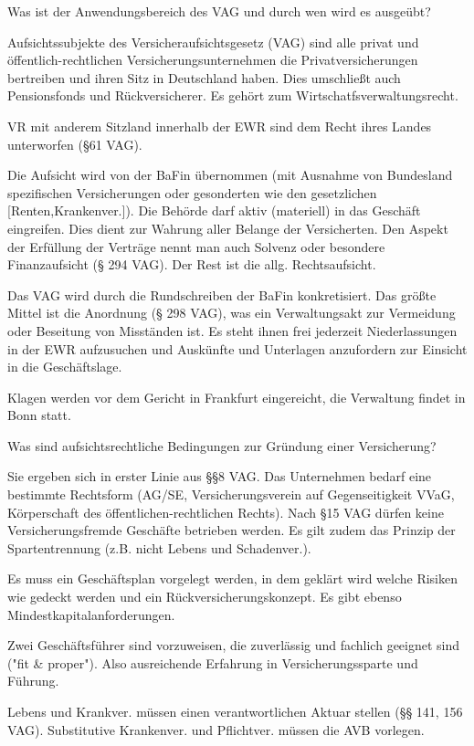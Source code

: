 Was ist der Anwendungsbereich des VAG
und durch wen wird es ausgeübt?

Aufsichtssubjekte des Versicheraufsichtsgesetz (VAG) sind
alle privat und öffentlich-rechtlichen Versicherungsunternehmen
die Privatversicherungen bertreiben und ihren Sitz in Deutschland haben.
Dies umschließt auch Pensionsfonds und Rückversicherer. Es gehört zum Wirtschatfsverwaltungsrecht.

VR mit anderem Sitzland innerhalb der EWR sind dem Recht ihres Landes unterworfen (§61 VAG).

Die Aufsicht wird von der BaFin übernommen (mit Ausnahme von Bundesland spezifischen Versicherungen oder gesonderten
wie den gesetzlichen [Renten,Krankenver.]).
Die Behörde darf aktiv (materiell) in das Geschäft eingreifen. Dies dient zur Wahrung aller Belange der Versicherten.
Den Aspekt der Erfüllung der Verträge nennt man auch Solvenz oder besondere Finanzaufsicht (§ 294 VAG). Der Rest ist die allg. Rechtsaufsicht.

Das VAG wird durch die Rundschreiben der BaFin konkretisiert. Das größte Mittel ist die Anordnung (§ 298 VAG), was ein Verwaltungsakt
zur Vermeidung oder Beseitung von Misständen ist. Es steht ihnen frei jederzeit Niederlassungen in der EWR aufzusuchen und
Auskünfte und Unterlagen anzufordern zur Einsicht in die Geschäftslage.

Klagen werden vor dem Gericht in Frankfurt eingereicht, die Verwaltung findet in Bonn statt.


Was sind aufsichtsrechtliche Bedingungen zur Gründung einer Versicherung?

Sie ergeben sich in erster Linie aus §§8 VAG. Das Unternehmen bedarf eine bestimmte Rechtsform 
(AG/SE, Versicherungsverein auf Gegenseitigkeit VVaG, Körperschaft des öffentlichen-rechtlichen Rechts).
Nach §15 VAG dürfen keine Versicherungsfremde Geschäfte betrieben werden. Es gilt zudem das Prinzip der Spartentrennung 
(z.B. nicht Lebens und Schadenver.).

Es muss ein Geschäftsplan vorgelegt werden, in dem geklärt wird welche Risiken wie gedeckt werden und ein Rückversicherungskonzept.
Es gibt ebenso Mindestkapitalanforderungen.

Zwei Geschäftsführer sind vorzuweisen, die zuverlässig und fachlich geeignet sind ("fit & proper"). Also ausreichende Erfahrung in 
Versicherungssparte und Führung.

Lebens und Krankver. müssen einen verantwortlichen Aktuar stellen (§§ 141, 156 VAG). Substitutive Krankenver. und Pflichtver. müssen die AVB
vorlegen.


